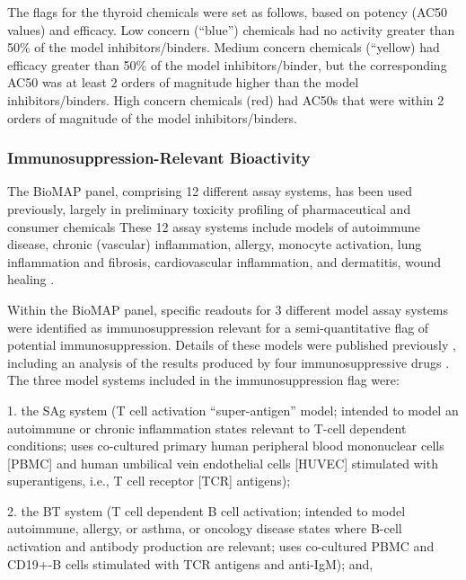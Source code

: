 \documentclass[
  super,
  preprint,
  3p]{elsarticle}
\begin{document}
The flags for the thyroid chemicals were set as follows, based on
potency (AC50 values) and efficacy. Low concern (``blue'') chemicals had
no activity greater than 50\% of the model inhibitors/binders. Medium
concern chemicals (``yellow) had efficacy greater than 50\% of the model
inhibitors/binder, but the corresponding AC50 was at least 2 orders of
magnitude higher than the model inhibitors/binders. High concern
chemicals (red) had AC50s that were within 2 orders of magnitude of the
model inhibitors/binders.~

\hypertarget{immunosuppression-relevant-bioactivity}{%
\subsubsection{Immunosuppression-Relevant
Bioactivity}\label{immunosuppression-relevant-bioactivity}}

The BioMAP panel, comprising 12 different assay systems, has been used
previously, largely in preliminary toxicity profiling of pharmaceutical
and consumer chemicals
\citep{hammitzsch_cbp30_2015, omahony_discriminating_2018, simms_use_2021}
These 12 assay systems include models of autoimmune disease, chronic
(vascular) inflammation, allergy, monocyte activation, lung inflammation
and fibrosis, cardiovascular inflammation, and dermatitis, wound healing
\citep{kleinstreuer_phenotypic_2014, houck_evaluation_2023}.

Within the BioMAP panel, specific readouts for 3 different model assay
systems were identified as immunosuppression relevant for a
semi-quantitative flag of potential immunosuppression. Details of these
models were published previously
\citep{kleinstreuer_phenotypic_2014, houck_evaluation_2023}, including
an analysis of the results produced by four immunosuppressive drugs
\citep{houck_evaluation_2023}. The three model systems included in the
immunosuppression flag were:

1. the SAg system (T cell activation ``super-antigen'' model; intended
to model an autoimmune or chronic inflammation states relevant to T-cell
dependent conditions; uses co-cultured primary human peripheral blood
mononuclear cells {[}PBMC{]} and human umbilical vein endothelial cells
{[}HUVEC{]} stimulated with superantigens, i.e., T cell receptor
{[}TCR{]} antigens);

2. the BT system (T cell dependent B cell activation; intended to model
autoimmune, allergy, or asthma, or oncology disease states where B-cell
activation and antibody production are relevant; uses co-cultured PBMC
and CD19+-B cells stimulated with TCR antigens and anti-IgM); and,
\end{document}
